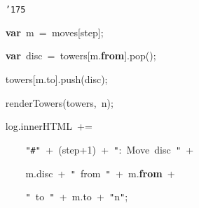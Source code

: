 \documentclass[a4paper,10pt]{article}
\def\mc{\relax}
\begin{document}
\noindent
\mbox{}{\tt\mc \ }{\tt\mc \ }{\tt\mc \ }{\tt\mc \ }{\tt\mc \ }{\tt\mc \ }{\tt\mc \ }{\tt\mc \ }{\tt\mc \ }{\tt\mc \ }{\tt\mc \ }{\tt\mc \ }{\tt\mc \ }{\tt\mc \ }{\tt\mc \ }{\tt\mc \ }{\tt\char'175}

\noindent
\mbox{}{\tt\mc \ }{\tt\mc \ }{\tt\mc \ }{\tt\mc \ }{\tt\mc \ }{\tt\mc \ }{\tt\mc \ }{\tt\mc \ }{\tt\mc \ }{\tt\mc \ }{\tt\mc \ }{\tt\mc \ }{\tt\mc \ }{\tt\mc \ }{\tt\mc \ }{\tt\mc \ }\textbf{var}{\tt\mc \ }m{\tt\mc \ }={\tt\mc \ }moves[step];

\noindent
\mbox{}{\tt\mc \ }{\tt\mc \ }{\tt\mc \ }{\tt\mc \ }{\tt\mc \ }{\tt\mc \ }{\tt\mc \ }{\tt\mc \ }{\tt\mc \ }{\tt\mc \ }{\tt\mc \ }{\tt\mc \ }{\tt\mc \ }{\tt\mc \ }{\tt\mc \ }{\tt\mc \ }\textbf{var}{\tt\mc \ }disc{\tt\mc \ }={\tt\mc \ }towers[m.\textbf{from}].pop();

\noindent
\mbox{}{\tt\mc \ }{\tt\mc \ }{\tt\mc \ }{\tt\mc \ }{\tt\mc \ }{\tt\mc \ }{\tt\mc \ }{\tt\mc \ }{\tt\mc \ }{\tt\mc \ }{\tt\mc \ }{\tt\mc \ }{\tt\mc \ }{\tt\mc \ }{\tt\mc \ }{\tt\mc \ }towers[m.to].push(disc);

\noindent
\mbox{}{\tt\mc \ }{\tt\mc \ }{\tt\mc \ }{\tt\mc \ }{\tt\mc \ }{\tt\mc \ }{\tt\mc \ }{\tt\mc \ }{\tt\mc \ }{\tt\mc \ }{\tt\mc \ }{\tt\mc \ }{\tt\mc \ }{\tt\mc \ }{\tt\mc \ }{\tt\mc \ }renderTowers(towers,{\tt\mc \ }n);

\noindent
\mbox{}{\tt\mc \ }{\tt\mc \ }{\tt\mc \ }{\tt\mc \ }{\tt\mc \ }{\tt\mc \ }{\tt\mc \ }{\tt\mc \ }{\tt\mc \ }{\tt\mc \ }{\tt\mc \ }{\tt\mc \ }{\tt\mc \ }{\tt\mc \ }{\tt\mc \ }{\tt\mc \ }log.innerHTML{\tt\mc \ }+=

\noindent
\mbox{}{\tt\mc \ }{\tt\mc \ }{\tt\mc \ }{\tt\mc \ }{\tt\mc \ }{\tt\mc \ }{\tt\mc \ }{\tt\mc \ }{\tt\mc \ }{\tt\mc \ }{\tt\mc \ }{\tt\mc \ }{\tt\mc \ }{\tt\mc \ }{\tt\mc \ }{\tt\mc \ }{\tt\mc \ }{\tt\mc \ }{\tt\mc \ }{\tt\mc \ }{\tt "}{\tt\#}{\tt "}{\tt\mc \ }+{\tt\mc \ }(step+1){\tt\mc \ }+{\tt\mc \ }{\tt "}:{\tt\mc \ }Move{\tt\mc \ }disc{\tt\mc \ }{\tt "}{\tt\mc \ }+

\noindent
\mbox{}{\tt\mc \ }{\tt\mc \ }{\tt\mc \ }{\tt\mc \ }{\tt\mc \ }{\tt\mc \ }{\tt\mc \ }{\tt\mc \ }{\tt\mc \ }{\tt\mc \ }{\tt\mc \ }{\tt\mc \ }{\tt\mc \ }{\tt\mc \ }{\tt\mc \ }{\tt\mc \ }{\tt\mc \ }{\tt\mc \ }{\tt\mc \ }{\tt\mc \ }m.disc{\tt\mc \ }+{\tt\mc \ }{\tt "}{\tt\mc \ }from{\tt\mc \ }{\tt "}{\tt\mc \ }+{\tt\mc \ }m.\textbf{from}{\tt\mc \ }+

\noindent
\mbox{}{\tt\mc \ }{\tt\mc \ }{\tt\mc \ }{\tt\mc \ }{\tt\mc \ }{\tt\mc \ }{\tt\mc \ }{\tt\mc \ }{\tt\mc \ }{\tt\mc \ }{\tt\mc \ }{\tt\mc \ }{\tt\mc \ }{\tt\mc \ }{\tt\mc \ }{\tt\mc \ }{\tt\mc \ }{\tt\mc \ }{\tt\mc \ }{\tt\mc \ }{\tt "}{\tt\mc \ }to{\tt\mc \ }{\tt "}{\tt\mc \ }+{\tt\mc \ }m.to{\tt\mc \ }+{\tt\mc \ }{\tt "}{\tt{}}n{\tt "};
\end{document}
